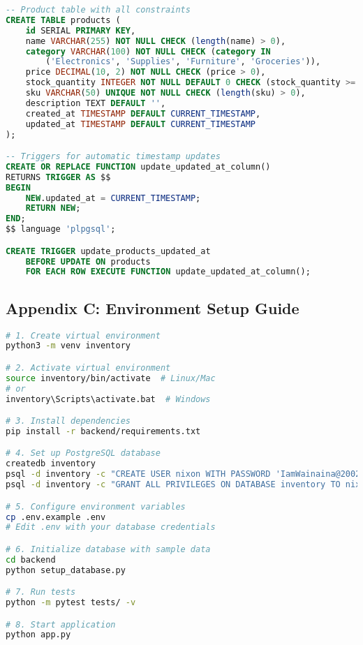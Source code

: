 \documentclass[12pt,a4paper]{article}
\begin{document}
\begin{lstlisting}[language=SQL, caption=Complete Database Schema]
-- Product table with all constraints
CREATE TABLE products (
    id SERIAL PRIMARY KEY,
    name VARCHAR(255) NOT NULL CHECK (length(name) > 0),
    category VARCHAR(100) NOT NULL CHECK (category IN 
        ('Electronics', 'Supplies', 'Furniture', 'Groceries')),
    price DECIMAL(10, 2) NOT NULL CHECK (price > 0),
    stock_quantity INTEGER NOT NULL DEFAULT 0 CHECK (stock_quantity >= 0),
    sku VARCHAR(50) UNIQUE NOT NULL CHECK (length(sku) > 0),
    description TEXT DEFAULT '',
    created_at TIMESTAMP DEFAULT CURRENT_TIMESTAMP,
    updated_at TIMESTAMP DEFAULT CURRENT_TIMESTAMP
);

-- Triggers for automatic timestamp updates
CREATE OR REPLACE FUNCTION update_updated_at_column()
RETURNS TRIGGER AS $$
BEGIN
    NEW.updated_at = CURRENT_TIMESTAMP;
    RETURN NEW;
END;
$$ language 'plpgsql';

CREATE TRIGGER update_products_updated_at 
    BEFORE UPDATE ON products 
    FOR EACH ROW EXECUTE FUNCTION update_updated_at_column();
\end{lstlisting}

\subsection{Appendix C: Environment Setup Guide}

\begin{lstlisting}[language=bash, caption=Complete Setup Instructions]
# 1. Create virtual environment
python3 -m venv inventory

# 2. Activate virtual environment
source inventory/bin/activate  # Linux/Mac
# or
inventory\Scripts\activate.bat  # Windows

# 3. Install dependencies
pip install -r backend/requirements.txt

# 4. Set up PostgreSQL database
createdb inventory
psql -d inventory -c "CREATE USER nixon WITH PASSWORD 'IamWainaina@2002';"
psql -d inventory -c "GRANT ALL PRIVILEGES ON DATABASE inventory TO nixon;"

# 5. Configure environment variables
cp .env.example .env
# Edit .env with your database credentials

# 6. Initialize database with sample data
cd backend
python setup_database.py

# 7. Run tests
python -m pytest tests/ -v

# 8. Start application
python app.py
\end{lstlisting}
\end{document}
